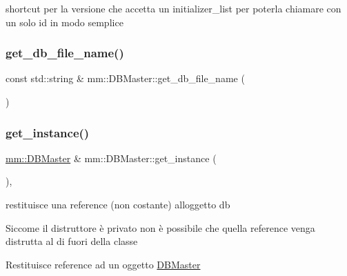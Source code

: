 shortcut per la versione che accetta un initializer\+\_\+list per poterla chiamare con un solo id in modo semplice 

\mbox{\label{classmm_1_1_d_b_master_a65586b91e19e610db40ef1d6e81cfd4a}} 
\subsubsection{\texorpdfstring{get\+\_\+db\+\_\+file\+\_\+name()}{get\_db\_file\_name()}}
{\footnotesize\ttfamily const std\+::string \& mm\+::\+D\+B\+Master\+::get\+\_\+db\+\_\+file\+\_\+name (\begin{DoxyParamCaption}{ }\end{DoxyParamCaption})\hspace{0.3cm}{\ttfamily [static]}}

\mbox{\label{classmm_1_1_d_b_master_a1f3b04e515b1999d3900353c0054f498}} 
\subsubsection{\texorpdfstring{get\+\_\+instance()}{get\_instance()}}
{\footnotesize\ttfamily \hyperlink{classmm_1_1_d_b_master}{mm\+::\+D\+B\+Master} \& mm\+::\+D\+B\+Master\+::get\+\_\+instance (\begin{DoxyParamCaption}{ }\end{DoxyParamCaption})\hspace{0.3cm}{\ttfamily [static]}, {\ttfamily [noexcept]}}



restituisce una reference (non costante) all\textquotesingle{}oggetto db 

Siccome il distruttore è privato non è possibile che quella reference venga distrutta al di fuori della classe

\begin{DoxyReturn}{Restituisce}
reference ad un oggetto \hyperlink{classmm_1_1_d_b_master}{D\+B\+Master} 
\end{DoxyReturn}
\mbox{\label{classmm_1_1_d_b_master_aef9d7063da9d7b4e0fb0a20a6d06368f}} 
